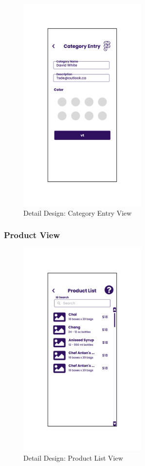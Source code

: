 \documentclass[../thesis.tex]{subfiles}
\begin{document}
\begin{figure}[H]
    \centering
    \includegraphics[width=0.57\textwidth]{images/DetailedDesign_Category_Entry.png}
    \caption{Detail Design: Category Entry View}
    \label{fig:DetailedDesign_Category_Entry}
\end{figure}

\subsubsection{Product View}

\begin{figure}[H]
    \centering
    \includegraphics[width=0.57\textwidth]{images/DetailedDesign_Product_List.png}
    \caption{Detail Design: Product List View}
    \label{fig:DetailedDesign_Product_List}
\end{figure}
\end{document}

